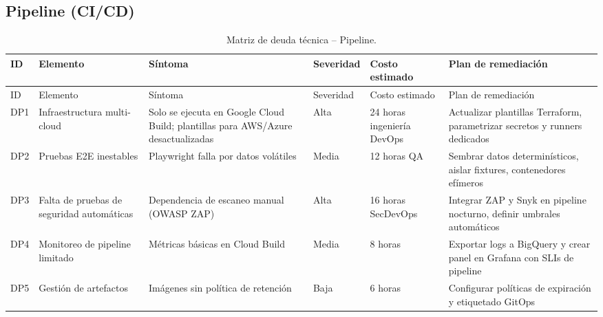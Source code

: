 \documentclass[12pt,letterpaper]{article}
\begin{document}
\subsection{Pipeline (CI/CD)}
\begin{longtable}{p{1cm} p{3.2cm} p{4.6cm} p{3.1cm} p{3cm} p{4.1cm}}
  \caption{Matriz de deuda técnica -- Pipeline.}\label{tab:deuda-pipeline}\\
  \toprule
  ID & Elemento & Síntoma & Severidad & Costo estimado & Plan de remediación \\
  \midrule
  \endfirsthead
  \toprule
  ID & Elemento & Síntoma & Severidad & Costo estimado & Plan de remediación \\
  \midrule
  \endhead
  DP1 & Infraestructura multi-cloud & Solo se ejecuta en Google Cloud Build; plantillas para AWS/Azure desactualizadas & Alta & 24 horas ingeniería DevOps & Actualizar plantillas Terraform, parametrizar secretos y runners dedicados \\
  DP2 & Pruebas E2E inestables & Playwright falla por datos volátiles & Media & 12 horas QA & Sembrar datos determinísticos, aislar fixtures, contenedores efímeros \\
  DP3 & Falta de pruebas de seguridad automáticas & Dependencia de escaneo manual (OWASP ZAP) & Alta & 16 horas SecDevOps & Integrar ZAP y Snyk en pipeline nocturno, definir umbrales automáticos \\
  DP4 & Monitoreo de pipeline limitado & Métricas básicas en Cloud Build & Media & 8 horas & Exportar logs a BigQuery y crear panel en Grafana con SLIs de pipeline \\
  DP5 & Gestión de artefactos & Imágenes sin política de retención & Baja & 6 horas & Configurar políticas de expiración y etiquetado GitOps \\
  \bottomrule
\end{longtable}
\end{document}
